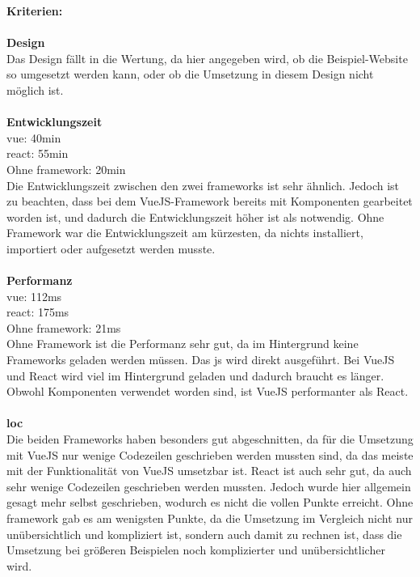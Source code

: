 \textbf{Kriterien:}\\\\
\textbf{Design}\\
Das Design fällt in die Wertung, da hier angegeben wird, ob die Beispiel-Website so umgesetzt werden kann, oder ob die Umsetzung in diesem Design nicht möglich ist.\\\\
\textbf{Entwicklungszeit}\\
\Gls{vue}: 40min\\
\Gls{react}: 55min\\
Ohne \Gls{framework}: 20min\\
Die Entwicklungszeit zwischen den zwei \Gls{framework}s ist sehr ähnlich. Jedoch ist zu beachten, dass bei dem VueJS-Framework bereits mit Komponenten gearbeitet worden ist, und dadurch die Entwicklungszeit höher ist als notwendig. Ohne Framework war die Entwicklungszeit am kürzesten, da nichts installiert, importiert oder aufgesetzt werden musste.\\\\
\textbf{Performanz}\\
\Gls{vue}: 112ms\\
\Gls{react}: 175ms\\
Ohne \Gls{framework}: 21ms\\
Ohne Framework ist die Performanz sehr gut, da im Hintergrund keine Frameworks geladen werden müssen. Das \Gls{js} wird direkt ausgeführt. Bei VueJS und React wird viel im Hintergrund geladen und dadurch braucht es länger. Obwohl Komponenten verwendet worden sind, ist VueJS performanter als React.\\\\
\textbf{\Gls{loc}}\\
Die beiden Frameworks haben besonders gut abgeschnitten, da für die Umsetzung mit VueJS nur wenige Codezeilen geschrieben werden mussten sind, da das meiste mit der Funktionalität von VueJS umsetzbar ist. React ist auch sehr gut, da auch sehr wenige Codezeilen geschrieben werden mussten. Jedoch wurde hier allgemein gesagt mehr selbst geschrieben, wodurch es nicht die vollen Punkte erreicht.
Ohne \Gls{framework} gab es am wenigsten Punkte, da die Umsetzung im Vergleich nicht nur unübersichtlich und kompliziert ist, sondern auch damit zu rechnen ist, dass die Umsetzung bei größeren Beispielen noch komplizierter und unübersichtlicher wird.
